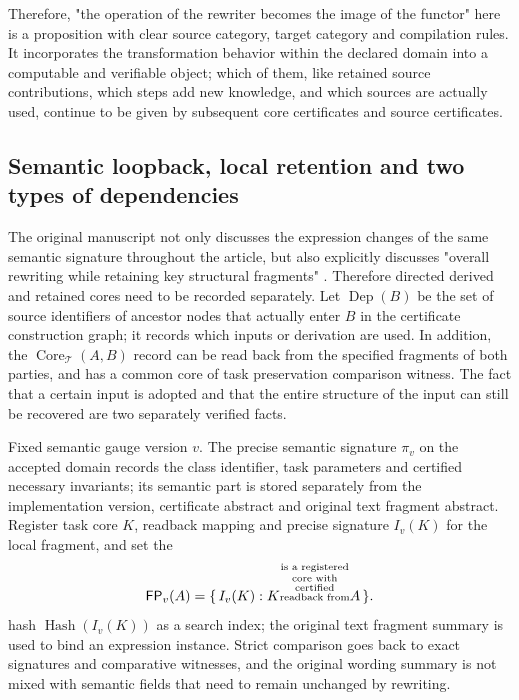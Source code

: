 \documentclass[11pt,a4paper]{article}
\theoremstyle{plain}
\theoremstyle{definition}
\theoremstyle{remark}
\begin{document}
\begin{CJK*}
Therefore, "the operation of the rewriter becomes the image of the functor" here is a proposition with clear source category, target category and compilation rules. It incorporates the transformation behavior within the declared domain into a computable and verifiable object; which of them, like retained source contributions, which steps add new knowledge, and which sources are actually used, continue to be given by subsequent core certificates and source certificates.



\subsection { Semantic loopback, local retention and two types of dependencies }\label{ar:local-core}


The original manuscript not only discusses the expression changes of the same semantic signature throughout the article, but also explicitly discusses "overall rewriting while retaining key structural fragments" \cite{S12}. Therefore directed derived and retained cores need to be recorded separately. Let $\operatorname{Dep}(B)$ be the set of source identifiers of ancestor nodes that actually enter $B$ in the certificate construction graph; it records which inputs or derivation are used. In addition, the $\operatorname{Core}_{\mathcal T}(A,B)$ record can be read back from the specified fragments of both parties, and has a common core of task preservation comparison witness. The fact that a certain input is adopted and that the entire structure of the input can still be recovered are two separately verified facts.

Fixed semantic gauge version $v$. The precise semantic signature $\pi_v$ on the accepted domain records the class identifier, task parameters and certified necessary invariants; its semantic part is stored separately from the implementation version, certificate abstract and original text fragment abstract. Register task core $K$, readback mapping and precise signature $I_v(K)$ for the local fragment, and set the \[
 \mathsf{FP}_v(A)
 =\{\,I_v(K):K\text{\shortstack[c]{\scriptsize is a registered\\[-1pt]\scriptsize core with\\[-1pt]\scriptsize certified\\[-1pt]\scriptsize readback from}}A\text{}\,\}.
\] hash $\operatorname{Hash}(I_v(K))$ as a search index; the original text fragment summary is used to bind an expression instance. Strict comparison goes back to exact signatures and comparative witnesses, and the original wording summary is not mixed with semantic fields that need to remain unchanged by rewriting.


\end{CJK*}
\end{document}
